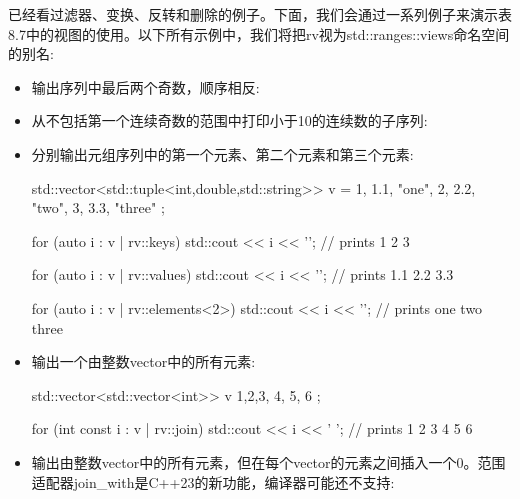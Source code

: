 已经看过滤器、变换、反转和删除的例子。下面，我们会通过一系列例子来演示表8.7中的视图的使用。以下所有示例中，我们将把rv视为std::ranges::views命名空间的别名:

\begin{itemize}
\item
输出序列中最后两个奇数，顺序相反:


\item
从不包括第一个连续奇数的范围中打印小于10的连续数的子序列:


\item
分别输出元组序列中的第一个元素、第二个元素和第三个元素:

\begin{cpp}
std::vector<std::tuple<int,double,std::string>> v =
{
	{1, 1.1, "one"},
	{2, 2.2, "two"},
	{3, 3.3, "three"}
};

for (auto i : v | rv::keys)
	std::cout << i << '\n'; // prints 1 2 3
	
for (auto i : v | rv::values)
	std::cout << i << '\n'; // prints 1.1 2.2 3.3
	
for (auto i : v | rv::elements<2>)
	std::cout << i << '\n'; // prints one two three
\end{cpp}

\item
输出一个由整数vector中的所有元素:

\begin{cpp}
std::vector<std::vector<int>> v {
	{1,2,3}, {4}, {5, 6}
};

for (int const i : v | rv::join)
	std::cout << i << ' '; // prints 1 2 3 4 5 6
\end{cpp}

\item
输出由整数vector中的所有元素，但在每个vector的元素之间插入一个0。范围适配器join\_with是C++23的新功能，编译器可能还不支持:


\end{itemize}
